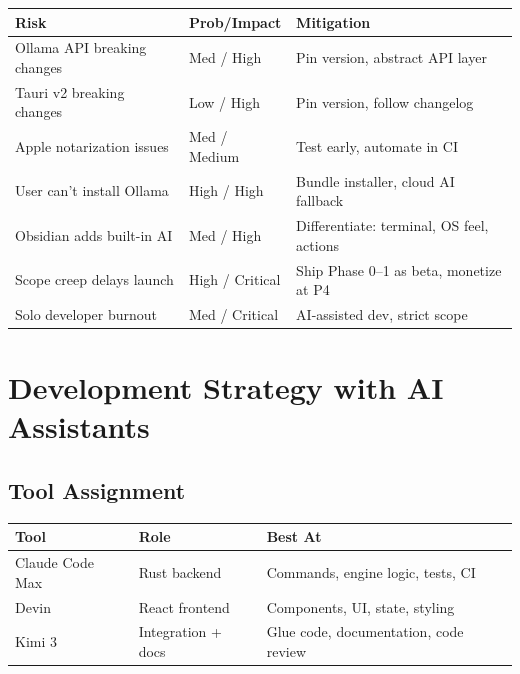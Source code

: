 \documentclass[11pt,a4paper]{article}
\begin{document}
\begin{table}[h]\centering\small
\begin{tabularx}{\textwidth}{XXX}
\toprule
\textbf{Risk} & \textbf{Prob/Impact} & \textbf{Mitigation} \\
\midrule
Ollama API breaking changes & Med / High & Pin version, abstract API layer \\
Tauri v2 breaking changes & Low / High & Pin version, follow changelog \\
Apple notarization issues & Med / Medium & Test early, automate in CI \\
User can't install Ollama & High / High & Bundle installer, cloud AI fallback \\
Obsidian adds built-in AI & Med / High & Differentiate: terminal, OS feel, actions \\
Scope creep delays launch & High / Critical & Ship Phase 0--1 as beta, monetize at P4 \\
Solo developer burnout & Med / Critical & AI-assisted dev, strict scope \\
\bottomrule
\end{tabularx}
\end{table}

\section{Development Strategy with AI Assistants}

\subsection{Tool Assignment}

\begin{table}[h]\centering\small
\begin{tabularx}{\textwidth}{XXX}
\toprule
\textbf{Tool} & \textbf{Role} & \textbf{Best At} \\
\midrule
Claude Code Max & Rust backend & Commands, engine logic, tests, CI \\
Devin & React frontend & Components, UI, state, styling \\
Kimi 3 & Integration + docs & Glue code, documentation, code review \\
\bottomrule
\end{tabularx}
\end{table}
\end{document}
